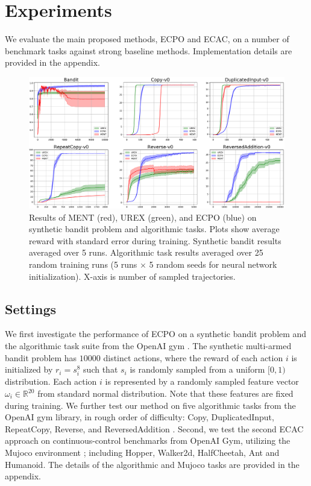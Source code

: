 
\section{Experiments}
\label{sec:experiments}

We evaluate the main proposed methods, ECPO and ECAC,
on a number of benchmark tasks against strong baseline methods.
Implementation details are provided in the appendix. 

\begin{figure}[t]
\begin{center}
\includegraphics[width=0.7\linewidth]{./bandit_algorithmic_results.pdf}
\end{center}
\caption{
Results of MENT (red), UREX (green), and ECPO (blue) on synthetic bandit
problem and algorithmic tasks.
Plots show average reward with standard error during training.
Synthetic bandit results averaged over 5 runs.
Algorithmic task results averaged over 25 random training runs
(5 runs $\times$ 5 random seeds for neural network initialization).
X-axis is number of sampled trajectories.
} 
\label{fig:results}
\end{figure}

\subsection{Settings}
\label{subsec:tasks}

We first investigate the performance of ECPO on a synthetic bandit problem
and the algorithmic task suite from the OpenAI gym \citep{brockman2016openai}.
The synthetic multi-armed bandit problem has $10000$ distinct actions,
where
the reward of each action $i$ is initialized by $r_i = s_i^{8}$
such that $s_i$ is randomly sampled from a uniform $[0,1)$ distribution.
Each action $i$ is represented by a randomly sampled feature vector
$\omega_i\in \mathbb{R}^{20}$ from standard normal distribution.
Note that these features are fixed during training.
We further test our method on five algorithmic tasks from the OpenAI gym
library, in rough order of difficulty:
Copy, DuplicatedInput, RepeatCopy, Reverse, and ReversedAddition
\citep{brockman2016openai}.
%
Second, we test the second ECAC approach on continuous-control benchmarks
from OpenAI Gym, utilizing the Mujoco environment
\citep{brockman2016openai,todorov2012mujoco};
including Hopper, Walker2d, HalfCheetah, Ant and Humanoid.
The details of the algorithmic and Mujoco tasks are provided in the appendix.

